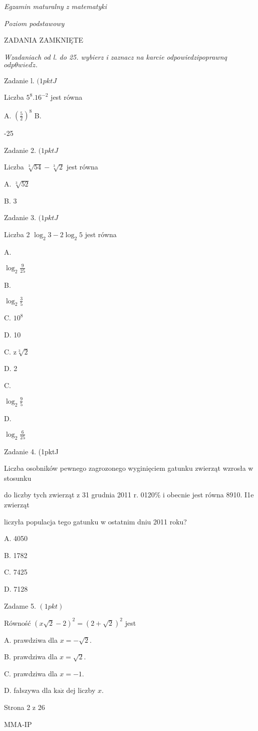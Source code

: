 \documentclass[a4paper,12pt]{article}
\begin{document}
{\it Egzamin maturalny z matematyki}

{\it Poziom podstawowy}

ZADANIA ZAMKNIĘTE

{\it Wzadaniach od l. do 25. wybierz i zaznacz na karcie odpowiedzipoprawnq} $odp\theta wied\acute{z}.$

Zadanie l. $(1pktJ$

Liczba $5^{8}.16^{-2}$ jest równa

A. $(\displaystyle \frac{5}{2})^{8}$ B.

-25

Zadanie 2. $(1pktJ$

Liczba $\sqrt[3]{54}-\sqrt[3]{2}$ jest równa

A. $\sqrt[3]{52}$

B. 3

Zadanie 3. $(1pktJ$

Liczba 2 $\log_{2}3-2\log_{2}5$ jest równa

A.

$\displaystyle \log_{2}\frac{9}{25}$

B.

$\log_{2} \displaystyle \frac{3}{5}$

C. $10^{8}$

D. 10

C. $\mathrm{z}\sqrt[3]{2}$

D. 2

C.

$\log_{2} \displaystyle \frac{9}{5}$

D.

$\displaystyle \log_{2}\frac{6}{25}$

Zadanie 4. (1pktJ

Liczba osobników pewnego zagrozonego wyginięciem gatunku zwierząt wzrosła w stosunku

do liczby tych zwierząt z 31 grudnia 2011 r. 0120\% i obecnie jest równa 8910. I1e zwierząt

liczyła populacja tego gatunku w ostatnim dniu 2011 roku?

A. 4050

B. 1782

C. 7425

D. 7128

Zadame 5. $(1pkt)$

Równość $(x\sqrt{2}-2)^{2}=(2+\sqrt{2})^{2}$ jest

A. prawdziwa dla $x=-\sqrt{2}.$

B. prawdziwa dla $x=\sqrt{2}.$

C. prawdziwa dla $x=-1.$

D. fałszywa dla $\mathrm{k}\mathrm{a}\dot{\mathrm{z}}$ dej liczby $x.$

Strona 2 z 26

MMA-IP
\end{document}
